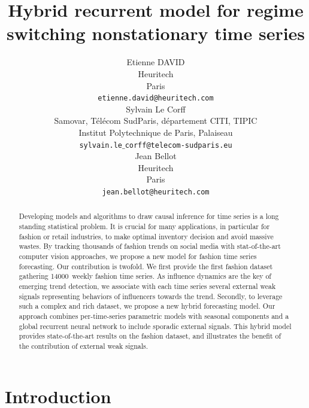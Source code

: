 \documentclass{article} %
\title{Hybrid recurrent model for regime switching nonstationary time series}
\author{Etienne DAVID \\
Heuritech \\
Paris \\
\texttt{etienne.david@heuritech.com} \\
\And
Sylvain Le Corff \\
Samovar, T\'el\'ecom SudParis, d\'epartement CITI, TIPIC \\
Institut Polytechnique de Paris, Palaiseau \\
\texttt{sylvain.le$\_$corff@telecom-sudparis.eu} \\
\And 
Jean Bellot \\
Heuritech \\
Paris \\
\texttt{jean.bellot@heuritech.com} \\
}
\newcommand{\numberts}{14000}
\begin{document}
\maketitle

\begin{abstract}
Developing models and algorithms to draw causal inference for time series is a long standing statistical problem. It is crucial for many applications, in particular for fashion or retail industries, to make optimal inventory decision and avoid massive wastes. By tracking thousands of fashion trends on social media with stat-of-the-art computer vision approaches, we propose a new model for fashion time series forecasting. Our contribution is  twofold. We first provide the first fashion dataset gathering \numberts\ weekly fashion time series. As influence dynamics are the key of emerging trend detection, we associate with each time series several external weak signals representing behaviors of influencers towards the trend. Secondly, to leverage such a complex and rich dataset, we propose a new hybrid forecasting model. Our approach combines per-time-series parametric models with seasonal components and a global recurrent neural network to include sporadic external signals. This hybrid model provides state-of-the-art results on the fashion dataset, and illustrates the benefit of the contribution of  external weak signals.
\end{abstract}

\section{Introduction}
\end{document}
